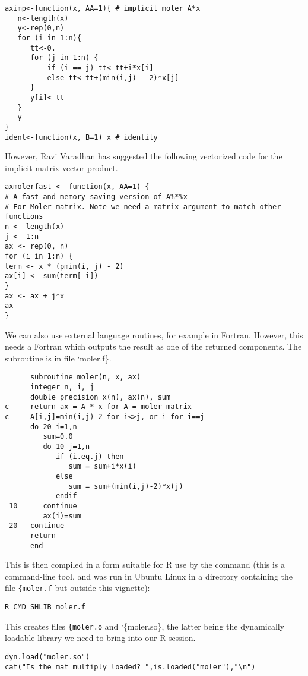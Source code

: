 \begin{verbatim}
aximp<-function(x, AA=1){ # implicit moler A*x
   n<-length(x)
   y<-rep(0,n)
   for (i in 1:n){
      tt<-0.
      for (j in 1:n) {
          if (i == j) tt<-tt+i*x[i]
          else tt<-tt+(min(i,j) - 2)*x[j]
      }
      y[i]<-tt 
   }
   y
}
ident<-function(x, B=1) x # identity
\end{verbatim}

However, Ravi Varadhan has suggested the following vectorized code for
the implicit matrix-vector product.

\begin{verbatim}
axmolerfast <- function(x, AA=1) {
# A fast and memory-saving version of A%*%x  
# For Moler matrix. Note we need a matrix argument to match other functions
n <- length(x)
j <- 1:n
ax <- rep(0, n)
for (i in 1:n) {
term <- x * (pmin(i, j) - 2)
ax[i] <- sum(term[-i]) 
}
ax <- ax + j*x
ax
}
\end{verbatim}

We can also use external language routines, for example in Fortran.
However, this needs a Fortran  which outputs the result as one of
the returned components. The subroutine is in file `moler.f\}.

\begin{verbatim}
      subroutine moler(n, x, ax)
      integer n, i, j
      double precision x(n), ax(n), sum
c     return ax = A * x for A = moler matrix
c     A[i,j]=min(i,j)-2 for i<>j, or i for i==j
      do 20 i=1,n
         sum=0.0
         do 10 j=1,n
            if (i.eq.j) then
               sum = sum+i*x(i)
            else
               sum = sum+(min(i,j)-2)*x(j)
            endif
 10      continue
         ax(i)=sum
 20   continue
      return
      end
\end{verbatim}

This is then compiled in a form suitable for R use by the command (this
is a command-line tool, and was run in Ubuntu Linux in a directory containing
the file \texttt{\{moler.f} but outside this vignette):

\begin{verbatim}
R CMD SHLIB moler.f
\end{verbatim}

This creates files \texttt{\{moler.o} and `\{moler.so\}, the latter being the
dynamically loadable library we need to bring into our R session.

\begin{verbatim}
dyn.load("moler.so")
cat("Is the mat multiply loaded? ",is.loaded("moler"),"\n")
\end{verbatim}

